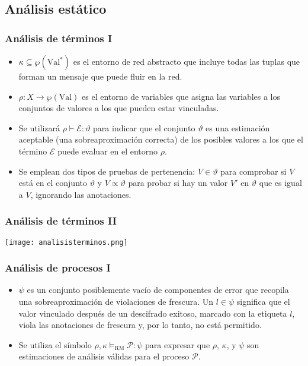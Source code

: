 \documentclass{beamer}
\begin{document}
\subsection{Análisis estático}

\begin{frame}
    \frametitle{Análisis de términos I}
    \pause
    \begin{itemize}

        \item<2-> $\kappa \subseteq \wp (\text{Val}^*)$ es el entorno de red abstracto que incluye todas las tuplas que forman un mensaje que puede fluir en la red.

        \item<3-> $\rho : X \rightarrow \wp (\text{Val})$ es el entorno de variables que asigna las variables a los conjuntos de valores a los que pueden estar vinculadas.
        
        \item<4-> Se utilizará $\rho \vdash \mathcal{E} : \vartheta$ para indicar que el conjunto $\vartheta$ es una estimación aceptable (una sobreaproximación correcta) de los posibles valores a los que el término $\mathcal{E}$ puede evaluar en el entorno $\rho$. 
        
        \item<5->Se emplean dos tipos de pruebas de pertenencia: $V \in \vartheta$ para comprobar si $V$ está en el conjunto $\vartheta$ y $V \propto \vartheta$ para probar si hay un valor $V'$ en $\vartheta$ que es igual a $V$, ignorando las anotaciones.
 
    \end{itemize}
\end{frame}

\begin{frame}
    \frametitle{Análisis de términos II}
    \pause
    \begin{center}
        \texttt{[image: analisisterminos.png]}
    \end{center}
\end{frame}

\begin{frame}
    \frametitle{Análisis de procesos I}
    \pause
    \begin{itemize}
        \item<2-> $\psi$ es un conjunto posiblemente vacío de componentes de error que recopila una sobreaproximación de violaciones de frescura. Un $l \in \psi$ significa que el valor vinculado después de un descifrado exitoso, marcado con la etiqueta $l$, viola las anotaciones de frescura y, por lo tanto, no está permitido.

        \item<3-> Se utiliza el símbolo $\rho, \kappa \vDash_{\text{RM}} \mathcal{P} : \psi$ para expresar que $\rho$, $\kappa$, y $\psi$ son estimaciones de análisis válidas para el proceso $\mathcal{P}$. 
        
    \end{itemize}
\end{frame}
\end{document}
